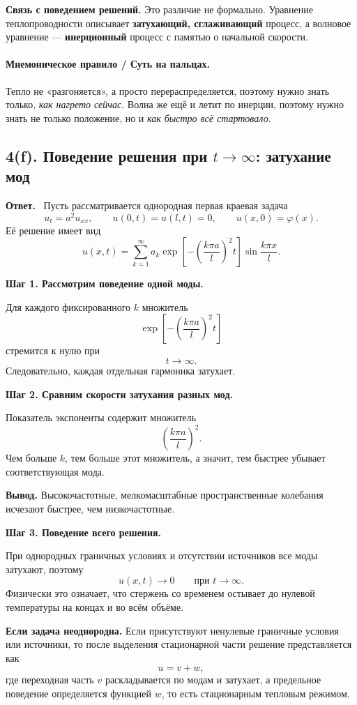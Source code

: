 \documentclass[a4paper,12pt]{article}
\newcommand{\Answer}{\textbf{Ответ.}\ }
\begin{document}
\textbf{Связь с поведением решений.}
Это различие не формально. Уравнение теплопроводности описывает \textbf{затухающий, сглаживающий} процесс, а волновое уравнение --- \textbf{инерционный} процесс с памятью о начальной скорости.

\paragraph{Мнемоническое правило / Суть на пальцах.}
Тепло не «разгоняется», а просто перераспределяется, поэтому нужно знать только, \textit{как нагрето сейчас}. Волна же ещё и летит по инерции, поэтому нужно знать не только положение, но и \textit{как быстро всё стартовало}.

\subsection*{4(f). Поведение решения при \texorpdfstring{$t\to\infty$}{t->infinity}: затухание мод}

\Answer
Пусть рассматривается однородная первая краевая задача
\[
u_t=a^2u_{xx},
\qquad
u(0,t)=u(l,t)=0,
\qquad
u(x,0)=\varphi(x).
\]
Её решение имеет вид
\[
u(x,t)=\sum_{k=1}^{\infty}
a_k\exp\!\left[-\left(\frac{k\pi a}{l}\right)^2t\right]
\sin\frac{k\pi x}{l}.
\]

\textbf{Шаг 1. Рассмотрим поведение одной моды.}

Для каждого фиксированного $k$ множитель
\[
\exp\!\left[-\left(\frac{k\pi a}{l}\right)^2t\right]
\]
стремится к нулю при
\[
t\to\infty.
\]
Следовательно, каждая отдельная гармоника затухает.

\textbf{Шаг 2. Сравним скорости затухания разных мод.}

Показатель экспоненты содержит множитель
\[
\left(\frac{k\pi a}{l}\right)^2.
\]
Чем больше $k$, тем больше этот множитель, а значит, тем быстрее убывает соответствующая мода.

\textbf{Вывод.} Высокочастотные, мелкомасштабные пространственные колебания исчезают быстрее, чем низкочастотные.

\textbf{Шаг 3. Поведение всего решения.}

При однородных граничных условиях и отсутствии источников все моды затухают, поэтому
\[
u(x,t)\to 0
\qquad \text{при } t\to\infty.
\]
Физически это означает, что стержень со временем остывает до нулевой температуры на концах и во всём объёме.

\textbf{Если задача неоднородна.}
Если присутствуют ненулевые граничные условия или источники, то после выделения стационарной части решение представляется как
\[
u=v+w,
\]
где переходная часть $v$ раскладывается по модам и затухает, а предельное поведение определяется функцией $w$, то есть стационарным тепловым режимом.
\end{document}
